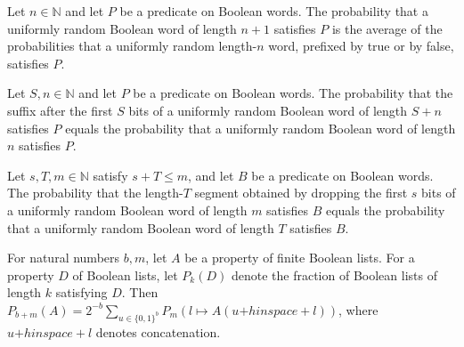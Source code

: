 \begin{theorem}
\label{Randomized.randProb_succ}
\leanok
{}
Let $n\in\mathbb N$ and let $P$ be a predicate on Boolean words. The probability that a
uniformly random Boolean word of length $n+1$ satisfies $P$ is the average of the
probabilities that a uniformly random length-$n$ word, prefixed by true or by false,
satisfies $P$.
\end{theorem}

\begin{theorem}
\label{Randomized.randProb_drop}
\leanok
{}
Let $S,n\in\mathbb{N}$ and let $P$ be a predicate on Boolean words. The probability that
the suffix after the first $S$ bits of a uniformly random Boolean word of length $S+n$
satisfies $P$ equals the probability that a uniformly random Boolean word of length $n$
satisfies $P$.
\end{theorem}

\begin{theorem}
\label{Randomized.randProb_drop_take}
\leanok
{}
Let $s,T,m\in\mathbb{N}$ satisfy $s+T\le m$, and let $B$ be a predicate on Boolean
words. The probability that the length-$T$ segment obtained by dropping the first $s$
bits of a uniformly random Boolean word of length $m$ satisfies $B$ equals the
probability that a uniformly random Boolean word of length $T$ satisfies $B$.
\end{theorem}

\begin{theorem}
\label{Randomized.randProb_append}
\leanok
{}
For natural numbers $b,m$, let $A$ be a property of finite Boolean lists. For a property
$D$ of Boolean lists, let $P_k(D)$ denote the fraction of Boolean lists of length $k$
satisfying $D$. Then $P_{b+m}(A)=2^{-b}\sum_{u\in\{0,1\}^b}P_m(l\mapsto
A(u\mathbin{+	hinspace+}l))$, where $u\mathbin{+	hinspace+}l$ denotes concatenation.
\end{theorem}

